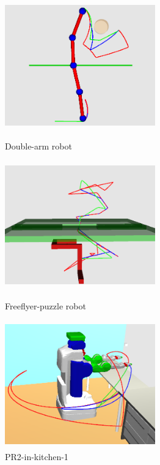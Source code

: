 \documentclass{tADR2e}
\begin{document}
\begin{figure}[ht]
  \begin{minipage}[b]{0.5\linewidth}
    \centering
    \includegraphics[width=6.5cm,height=5.5cm]{ur2_orth_constr_results.png}
    \caption*{Double-arm robot}
    \vspace{1ex}
  \end{minipage}%
  \begin{minipage}[b]{0.5\linewidth}
    \centering
    \includegraphics[width=6.5cm,height=5.5cm]{puzzle_orth_constr_results.png}
    \caption*{Freeflyer-puzzle robot}
    \vspace{1ex}
  \end{minipage} 
  \begin{minipage}[b]{0.5\linewidth}
    \centering
    \includegraphics[width=6.5cm,height=5.5cm]{pr2-kitchen1_orth_constr_results.png}
    \caption*{PR2-in-kitchen-1}
    \vspace{1ex}

\end{minipage}
\end{figure}
\end{document}
